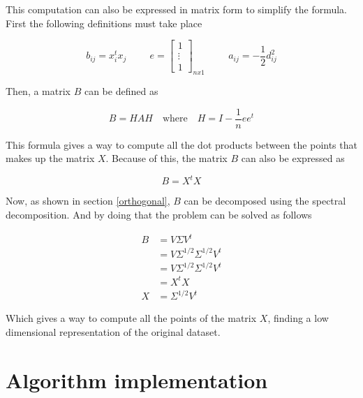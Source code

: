\documentclass[12pt,journal]{IEEEtran}
\begin{document}
    This computation can also be expressed in matrix form to simplify the formula.
    First the following definitions must take place

    \[
        b_{ij} = x_i^t x_j
        \hspace{1cm}
        e =
        \begin{bmatrix}
            1\\
            \vdots\\
            1
        \end{bmatrix}_{nx1}
        \hspace{1cm}
        a_{ij} = -\frac{1}{2} d_{ij}^2
    \]

    Then, a matrix $B$ can be defined as

    \begin{equation*}
        B = H A H \quad \text{where} \quad H = I - \frac{1}{n} e e^t
    \end{equation*}

    This formula gives a way to compute all the dot products between the points
    that makes up the matrix $X$. Because of this, the matrix $B$ can also
    be expressed as

    \begin{equation*}
        B = X^tX
    \end{equation*}

    Now, as shown in section \ref{orthogonal}, $B$ can be decomposed using the
    spectral decomposition. And by doing that the problem can be solved as follows

    \begin{equation*}
        \begin{aligned}
            B &= V \Sigma V^t\\
              &= V \Sigma^{1/2} \Sigma^{1/2} V^t\\
              &= V \Sigma^{1/2} \Sigma^{1/2} V^t\\
              &= X^t X\\
            X & = \Sigma^{1/2} V^t
        \end{aligned}
    \end{equation*}

    Which gives a way to compute all the points of the matrix $X$, finding a low
    dimensional representation of the original dataset.

\section{Algorithm implementation}
\end{document}
